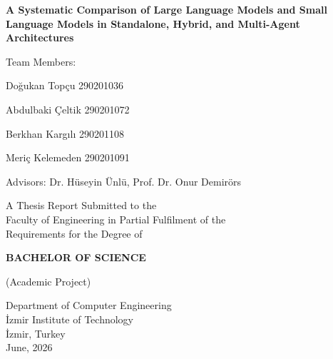\begin{titlepage}
    \centering
    \vspace*{2cm}

    {\Huge \sffamily \textbf{A Systematic Comparison of Large Language Models and Small Language Models in Standalone, Hybrid, and Multi-Agent Architectures} \par}
    \vspace{4cm}

    {\large
    \sffamily Team Members:\par
    Doğukan Topçu 290201036\par
    Abdulbaki Çeltik 290201072\par
    Berkhan Kargılı 290201108\par
    Meriç Kelemeden 290201091\par
    }

    \vspace{1cm}
    {\large \sffamily Advisors: Dr. Hüseyin Ünlü, Prof. Dr. Onur Demirörs }

    \vfill

    {\large \sffamily
    A Thesis Report Submitted to the \\
    Faculty of Engineering in Partial Fulfilment of the \\
    Requirements for the Degree of
    }

    \vspace{0.5cm}
    {\LARGE \sffamily \textbf{BACHELOR OF SCIENCE}}

    \vspace{0.5cm}
    \sffamily (Academic Project)

    \vspace{1cm}
    \sffamily Department of Computer Engineering \\
    İzmir Institute of Technology \\
    İzmir, Turkey \\
    June, 2026

\end{titlepage}
